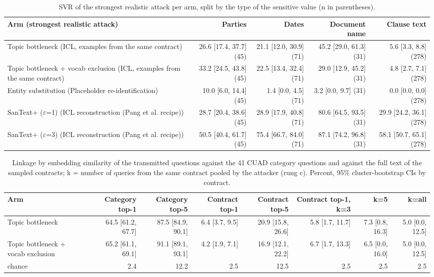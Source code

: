 \begin{table}[t]
\centering\small
\caption{SVR of the strongest realistic attack per arm, split by the type of the sensitive value (n in parentheses).}
\label{tab:typed}
\begin{tabular}{lrrrr}
\toprule
Arm (strongest realistic attack) & Parties & Dates & Document name & Clause text \\
\midrule
Topic bottleneck (ICL, examples from the same contract) & 26.6 [17.4, 37.7] (45) & 21.1 [12.0, 30.9] (71) & 45.2 [29.0, 61.3] (31) & 5.6 [3.3, 8.8] (278) \\
Topic bottleneck + vocab exclusion (ICL, examples from the same contract) & 33.2 [24.5, 43.8] (45) & 22.5 [13.4, 32.4] (71) & 29.0 [12.9, 45.2] (31) & 4.8 [2.7, 7.1] (278) \\
Entity substitution (Placeholder re-identification) & 10.0 [6.0, 14.4] (45) & 1.4 [0.0, 4.5] (71) & 3.2 [0.0, 9.7] (31) & 0.0 [0.0, 0.0] (278) \\
SanText+ ($\varepsilon$=1) (ICL reconstruction (Pang et al. recipe)) & 28.7 [20.4, 38.6] (45) & 28.9 [17.9, 40.8] (71) & 80.6 [64.5, 93.5] (31) & 29.9 [24.2, 36.1] (278) \\
SanText+ ($\varepsilon$=3) (ICL reconstruction (Pang et al. recipe)) & 50.5 [40.4, 61.7] (45) & 75.4 [66.7, 84.0] (71) & 87.1 [74.2, 96.8] (31) & 58.1 [50.7, 65.1] (278) \\
\bottomrule
\end{tabular}
\end{table}

\begin{table}[t]
\centering\small
\caption{Linkage by embedding similarity of the transmitted questions against the 41 CUAD category questions and against the full text of the sampled contracts; k = number of queries from the same contract pooled by the attacker (rung c). Percent, 95\% cluster-bootstrap CIs by contract.}
\label{tab:linkage}
\begin{tabular}{lrrrrrrr}
\toprule
Arm & Category top-1 & Category top-5 & Contract top-1 & Contract top-5 & Contract top-1, k=3 & k=5 & k=all \\
\midrule
Topic bottleneck & 64.5 [61.2, 67.7] & 87.5 [84.9, 90.1] & 6.4 [3.7, 9.5] & 20.9 [15.8, 26.6] & 5.8 [1.7, 11.7] & 7.3 [0.8, 16.3] & 5.0 [0.0, 12.5] \\
Topic bottleneck + vocab exclusion & 65.2 [61.1, 69.1] & 91.1 [89.1, 93.1] & 4.2 [1.9, 7.1] & 16.9 [12.1, 22.2] & 6.7 [1.7, 13.3] & 6.5 [0.0, 16.0] & 5.0 [0.0, 12.5] \\
chance & 2.4 & 12.2 & 2.5 & 12.5 & 2.5 & 2.5 & 2.5 \\
\bottomrule
\end{tabular}
\end{table}

